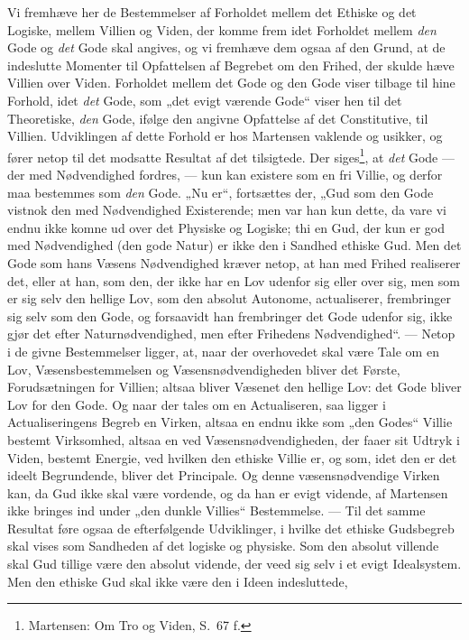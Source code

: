 \documentclass[12pt,a4paper]{book}
\newcommand{\opage}[1]{\marginnote{\footnotesize\textit{[#1]}}}
\begin{document}
Vi fremhæve her de Bestemmelser af Forholdet mellem det Ethiske og det Logiske,
mellem Villien og Viden, der \opage{62}komme frem idet Forholdet mellem \emph{den} Gode og \emph{det} Gode
skal angives, og vi fremhæve dem ogsaa af den Grund, at de indeslutte Momenter til
Opfattelsen af Begrebet om den Frihed, der skulde hæve Villien over Viden.
Forholdet mellem det Gode og den Gode viser tilbage til hine Forhold, idet \emph{det} Gode, som „det evigt værende Gode“ viser hen til det Theoretiske, \emph{den} Gode, ifølge
den angivne Opfattelse af det Constitutive, til Villien. Udviklingen af dette
Forhold er hos Martensen vaklende og usikker, og fører netop til det modsatte
Resultat af det tilsigtede. Der siges\footnote{Martensen: Om Tro og Viden, S.\ 67
f.}, at \emph{det} Gode --- der med Nødvendighed fordres, --- kun kan existere som en fri
Villie, og derfor maa bestemmes som \emph{den} Gode. „Nu er“, fortsættes der, „Gud som den
Gode vistnok den med Nødvendighed Existerende; men var han kun dette, da vare vi
endnu ikke komne ud over det Physiske og Logiske; thi en Gud, der kun er god med
Nødvendighed (den gode Natur) er ikke den i Sandhed ethiske Gud. Men det Gode som
hans Væsens Nødvendighed kræver netop, at han med Frihed realiserer det, eller at
han, som den, der ikke har en Lov udenfor sig eller over sig, men som er sig selv
den hellige Lov, som den absolut Autonome, actualiserer, frembringer sig selv som
den Gode, og forsaavidt han frembringer det Gode udenfor sig, ikke gjør det efter
Naturnødvendighed, men efter Frihedens Nødvendighed“. --- Netop i de givne
Bestemmelser ligger, at, naar der overhovedet skal være Tale om en Lov,
Væsensbestemmelsen og Væsensnødvendigheden bliver det Første, Forudsætningen for
Villien; altsaa bliver Væsenet den hellige Lov: det Gode bliver Lov for den Gode.
Og naar der tales om en Actualiseren, saa ligger i Actualiseringens Begreb en
Virken, altsaa en endnu ikke som „den Godes“ Villie bestemt Virksomhed, altsaa en
ved Væsensnødvendigheden, der faaer sit Udtryk i Viden, bestemt Energie, ved
hvilken den ethiske Villie er, og som, idet den er det ideelt \opage{63}Begrundende, bliver
det Principale. Og denne væsensnødvendige Virken kan, da Gud ikke skal være
vordende, og da han er evigt vidende, af Martensen ikke bringes ind under „den
dunkle Villies“ Bestemmelse.
--- Til det samme Resultat føre ogsaa de efterfølgende Udviklinger, i hvilke det
ethiske Gudsbegreb skal vises som Sandheden af det logiske og physiske. Som den
absolut villende skal Gud tillige være den absolut vidende, der veed sig selv i et
evigt Idealsystem. Men den ethiske Gud skal ikke være den i Ideen indesluttede,
\end{document}
